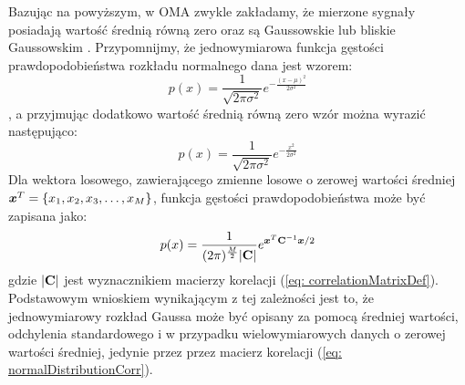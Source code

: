 Bazując na powyższym, w OMA zwykle zakładamy, że mierzone sygnały posiadają wartość średnią równą zero oraz są Gaussowskie  lub bliskie Gaussowskim \parencite{Brincker2015}. Przypomnijmy, że jednowymiarowa funkcja gęstości prawdopodobieństwa rozkładu normalnego dana jest wzorem:
\begin{equation}
	p(x) = \frac{1}{\sqrt{2\pi\sigma^2}}e^{-\frac{(x-\mu)^2}{2\sigma^2}}
\end{equation}
, a przyjmując dodatkowo wartość średnią równą
 zero wzór można wyrazić następująco:
\begin{equation} \label{eq:normalDensZeroMean}
	p(x) = \frac{1}{\sqrt{2\pi\sigma^2}}e^{-\frac{x^2}{2\sigma^2}}
\end{equation}
Dla wektora losowego, zawierającego zmienne losowe o zerowej wartości średniej $\bm{x}^T=\{x_1,x_2,x_3,\hdots,x_M\}$, funkcja gęstości prawdopodobieństwa może być zapisana jako:
\begin{equation}\label{eq: normalDistributionCorr}
	p(x) = \frac{1}{(2\pi)^\frac{M}{2} \mathbf{|C|}}e^{\bm{x}^T\mathbf{C}^{-1}\bm{x}/2}
\end{equation}
gdzie $|\mathbf{C}|$ jest wyznacznikiem macierzy korelacji (\ref{eq: correlationMatrixDef}). Podstawowym wnioskiem wynikającym z tej zależności jest to, że jednowymiarowy rozkład Gaussa może być opisany za pomocą średniej wartości, odchylenia standardowego i w przypadku wielowymiarowych danych o zerowej wartości średniej, jedynie przez przez macierz korelacji (\ref{eq: normalDistributionCorr}).

